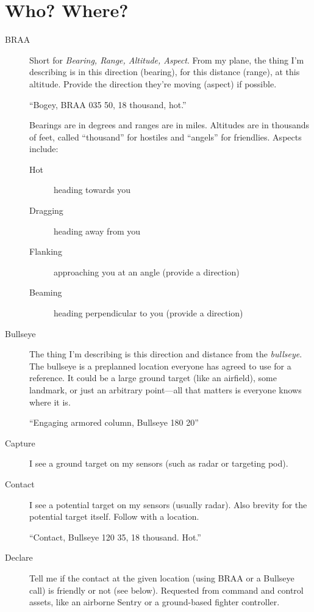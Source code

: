 \section{Who? Where?}

\begin{description}
\item[BRAA] Short for \emph{Bearing, Range, Altitude, Aspect}.
    From my plane, the thing I'm describing is in this direction
    (bearing), for this distance (range), at this altitude.
    Provide the direction they're moving (aspect) if possible.

    ``Bogey, BRAA 035 50, 18 thousand, hot.''

    Bearings are in degrees and ranges are in miles.
    Altitudes are in thousands of feet, called ``thousand'' for hostiles
    and ``angels'' for friendlies. Aspects include:
    \begin{description}
    \item[Hot] heading towards you
    \item[Dragging] heading away from you
    \item[Flanking] approaching you at an angle (provide a direction)
    \item[Beaming] heading perpendicular to you (provide a direction)
    \end{description}

\item[Bullseye] The thing I'm describing is this direction and distance
    from the \emph{bullseye}.
    The bullseye is a preplanned location everyone has agreed to use for
    a reference. It could be a large ground target (like an airfield),
    some landmark, or just an arbitrary point---all that matters is
    everyone knows where it is.

    ``Engaging armored column, Bullseye 180 20''

\item[Capture] I see a ground target on my sensors (such as radar
    or targeting pod).

\item[Contact] I see a potential target on my sensors (usually radar).
    Also brevity for the potential target itself.
    Follow with a location.

    ``Contact, Bullseye 120 35, 18 thousand. Hot.''

\item[Declare] Tell me if the contact at the given location
    (using BRAA or a Bullseye call) is friendly or not (see below).
    Requested from command and control  assets,
    like an airborne  Sentry
    or a ground-based fighter controller.


\end{description}
